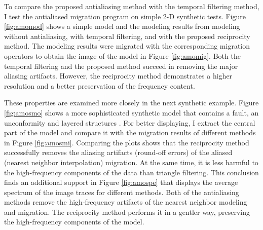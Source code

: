 

To compare the proposed antialiasing method with the temporal
filtering method, I test the antialiased migration program on simple
2-D synthetic tests. Figure \ref{fig:amomod} shows a simple model and
the modeling results from modeling without antialiasing, with temporal
filtering, and with the proposed reciprocity method.  The modeling
results were migrated with the corresponding migration operators to
obtain the image of the model in Figure \ref{fig:amomig}.  Both the
temporal filtering and the proposed method succeed in removing the
major aliasing artifacts. However, the reciprocity method demonstrates
a higher resolution and a better preservation of the frequency
content.




These properties are examined more closely in the next synthetic
example. Figure \ref{fig:amosmo} shows a more sophisticated synthetic
model that contains a fault, an unconformity and layered structures
\cite[]{Claerbout.bei.95}. For better displaying, I extract the central
part of the model and compare it with the migration results of
different methods in Figure \ref{fig:amosmi}. Comparing the plots
shows that the reciprocity method successfully removes the aliasing
artifacts (round-off errors) of the aliased (nearest neighbor
interpolation) migration.  At the same time, it is less harmful to the
high-frequency components of the data than triangle filtering. This
conclusion finds an additional support in Figure \ref{fig:amospe} that
displays the average spectrum of the image traces for different
methods. Both of the antialiasing methods remove the high-frequency
artifacts of the nearest neighbor modeling and migration. The
reciprocity method performs it in a gentler way, preserving the
high-frequency components of the model.

